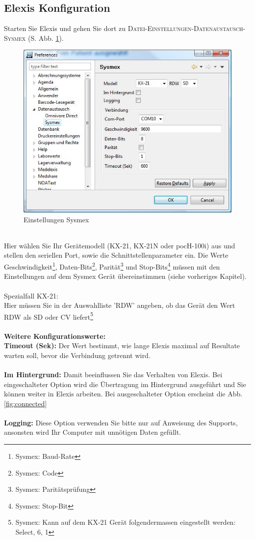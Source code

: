 \documentclass[a4paper]{scrartcl}
\begin{document}
\subsection{Elexis Konfiguration}
Starten Sie Elexis und gehen Sie dort zu \textsc{Datei-Einstellungen-Datenaustausch-Sysmex} (S. Abb. \ref{fig:config}).
\begin{figure}[h]
    \centering
    \includegraphics{config}
    \caption{Einstellungen Sysmex}
    \label{fig:config}
\end{figure}
\\
Hier w\"ahlen Sie Ihr Ger\"atemodell (KX-21, KX-21N oder pocH-100i) aus und stellen den seriellen Port, sowie die Schnittstellenparameter ein. Die Werte Geschwindigkeit\footnote{Sysmex: Baud-Rate}, Daten-Bits\footnote{Sysmex: Code}, Parit\"at\footnote{Sysmex: Parit\"atspr\"ufung} und Stop-Bits\footnote{Sysmex: Stop-Bit} m\"ussen mit den Einstellungen auf dem Sysmex Ger\"at \"ubereinstimmen (siehe vorheriges Kapitel).\\
\\
Spezialfall KX-21:\\
Hier m\"ussen Sie in der Auswahlliste 'RDW' angeben, ob das Ger\"at den Wert RDW als SD oder CV liefert\footnote{Sysmex: Kann auf dem KX-21 Ger\"at folgendermassen eingestellt werden: Select, 6, 1}\\
\\
\textbf{Weitere Konfigurationswerte:}\\
\textbf{Timeout (Sek):} Der Wert bestimmt, wie lange Elexis maximal auf Resultate warten soll, bevor die Verbindung getrennt wird.\\
\\
\textbf{Im Hintergrund:} Damit beeinflussen Sie das Verhalten von Elexis. Bei eingeschalteter Option wird die \"Ubertragung im Hintergrund ausgef\"uhrt und Sie k\"onnen weiter in Elexis arbeiten. Bei ausgeschalteter Option erscheint die Abb. \ref{fig:connected}\\
\\
\textbf{Logging:} Diese Option verwenden Sie bitte nur auf Anweisung des Supports, ansonsten wird Ihr Computer mit unn\"otigen Daten gef\"ullt.\\
\end{document}
